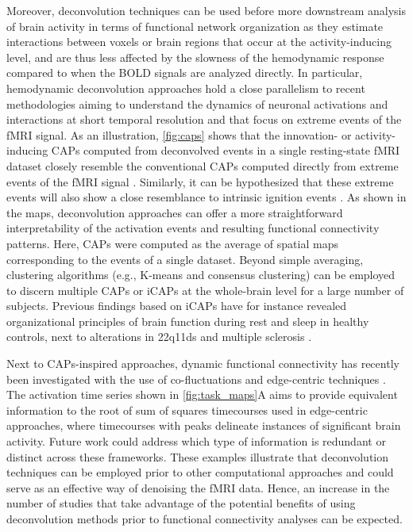 Moreover, deconvolution techniques can be used before more downstream analysis
of brain activity in terms of functional network organization as they estimate
interactions between voxels or brain regions that occur at the activity-inducing
level, and are thus less affected by the slowness of the hemodynamic response
compared to when the BOLD signals are analyzed directly. In particular,
hemodynamic deconvolution approaches hold a close parallelism to recent
methodologies aiming to understand the dynamics of neuronal activations and
interactions at short temporal resolution and that focus on extreme events of
the fMRI signal. As an illustration, \cref{fig:caps} shows that the innovation-
or activity-inducing CAPs computed from deconvolved events in a single
resting-state fMRI dataset closely resemble the conventional CAPs computed
directly from extreme events of the fMRI signal
\citep{Liu2013Timevaryingfunctional,Liu2013Decompositionspontaneousbrain,
Liu2018Coactivationpatterns,Cifre2020Revisitingnonlinear,Cifre2020Furtherresultswhy,
Zhang2020relationshipBOLDneural,Tagliazucchi2011SpontaneousBOLDevent,Tagliazucchi2012Criticalitylargescale,
Tagliazucchi2016VoxelWiseFunctional,Rolls2021BraindynamicsSynchronous}.
Similarly, it can be hypothesized that these extreme events will also show a
close resemblance to intrinsic ignition events
\citep{Deco2017HierarchyInformationProcessing,Deco2017NovelIntrinsicIgnition}.
As shown in the maps, deconvolution approaches can offer a more straightforward
interpretability of the activation events and resulting functional connectivity
patterns. Here, CAPs were computed as the average of spatial maps corresponding
to the events of a single dataset. Beyond simple averaging, clustering
algorithms (e.g., K-means and consensus clustering) can be employed to discern
multiple CAPs or iCAPs at the whole-brain level for a large number of subjects.
Previous findings based on iCAPs have for instance revealed organizational
principles of brain function during rest
\citep{Karahanoglu2015Transientbrainactivity} and sleep
\citep{Tarun2021NREMsleepstages} in healthy controls, next to alterations in
22q11ds \citep{Zoeller2019LargeScaleBrain} and multiple sclerosis
\citep{Bommarito2021Alteredanteriordefault}. 

Next to CAPs-inspired approaches, dynamic functional connectivity has recently
been investigated with the use of co-fluctuations and edge-centric techniques
\citep{Faskowitz2020Edgecentricfunctional,Esfahlani2020Highamplitudecofluctuations,Jo2021Subjectidentificationusing,Sporns2021Dynamicexpressionbrain,Oort2018Functionalparcellationusing}.
The activation time series shown in \cref{fig:task_maps}A aims to provide
equivalent information to the root of sum of squares timecourses used in
edge-centric approaches, where timecourses with peaks delineate instances of
significant brain activity. Future work could address which type of information
is redundant or distinct across these frameworks. These examples illustrate that
deconvolution techniques can be employed prior to other computational approaches
and could serve as an effective way of denoising the fMRI data. Hence, an
increase in the number of studies that take advantage of the potential benefits
of using deconvolution methods prior to functional connectivity analyses can be
expected.


